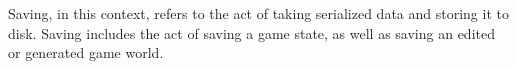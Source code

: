 Saving, in this context, refers to the act of taking serialized data and storing it to disk. Saving includes the act of saving a game state, as well as saving an edited or generated game world.

